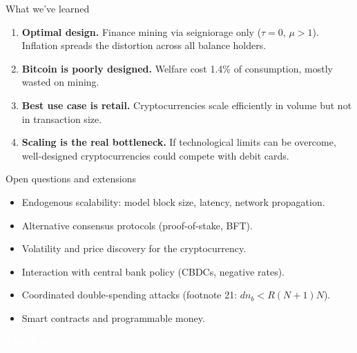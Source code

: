 \documentclass[aspectratio=169,xcolor=dvipsnames]{beamer}
\begin{document}
\begin{frame}{What we've learned}
    \begin{enumerate}
        \item \textbf{Optimal design.} Finance mining via seigniorage only ($\tau=0$, $\mu>1$).
              Inflation spreads the distortion across all balance holders.
        \vspace{2mm}
        \item \textbf{Bitcoin is poorly designed.} Welfare cost 1.4\% of consumption,
              mostly wasted on mining.
        \vspace{2mm}
        \item \textbf{Best use case is retail.} Cryptocurrencies scale efficiently in
              volume but not in transaction size.
        \vspace{2mm}
        \item \textbf{Scaling is the real bottleneck.} If technological limits can be
              overcome, well-designed cryptocurrencies could compete with debit cards.
    \end{enumerate}
\end{frame}

\begin{frame}{Open questions and extensions}
    \begin{itemize}
        \item Endogenous scalability: model block size, latency, network propagation.
        \item Alternative consensus protocols (proof-of-stake, BFT).
        \item Volatility and price discovery for the cryptocurrency.
        \item Interaction with central bank policy (CBDCs, negative rates).
        \item Coordinated double-spending attacks (footnote 21: $d n_b < R(N+1)N$).
        \item Smart contracts and programmable money.
    \end{itemize}
\end{frame}

{
\begin{frame}
    \centering
    \vspace{2mm}
    \Huge \textcolor{white}{\textbf{Thank you}}
\end{frame}
}
\end{document}
